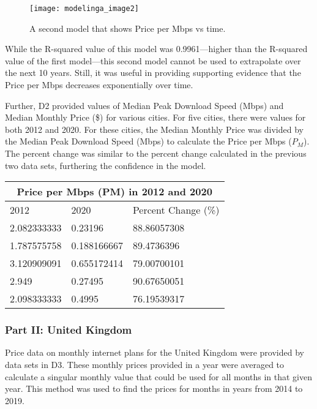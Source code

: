 	\renewcommand{\thefigure}{2}
	\begin{figure}[htp]
    \centering
    \begin{minipage}{9cm}
    \texttt{[image: modelinga\_image2]}
    \caption{A second model that shows Price per Mbps vs time.}
    \label{fig:2}
    \end{minipage}
    \end{figure}
	
	While the R-squared value of this model was 0.9961—higher than the R-squared value of the first model—this second model cannot be used to extrapolate over the next 10 years. Still, it was useful in providing supporting evidence that the Price per Mbps decreases exponentially over time.

    Further, D2 provided values of Median Peak Download Speed (Mbps) and Median Monthly Price (\$) for various cities. For five cities, there were values for both 2012 and 2020. For these cities, the Median Monthly Price was divided by the Median Peak Download Speed (Mbps) to calculate the Price per Mbps ($P_M$). The percent change was similar to the percent change calculated in the previous two data sets, furthering the confidence in the model.
	
	
	\begin{center}
\begin{tabular}{|l|l|l|}
\hline
\multicolumn{3}{|c|}{Price per Mbps (PM) in 2012 and 2020} \\ \hline
2012            & 2020            & Percent Change (\%)    \\ \hline
2.082333333     & 0.23196         & 88.86057308            \\ \hline
1.787575758     & 0.188166667     & 89.4736396             \\ \hline
3.120909091     & 0.655172414     & 79.00700101            \\ \hline
2.949           & 0.27495         & 90.67650051            \\ \hline
2.098333333     & 0.4995          & 76.19539317            \\ \hline
\end{tabular}
\end{center}
	
    \subsubsection*{Part II: United Kingdom}
    
    Price data on monthly internet plans for the United Kingdom were provided by data sets in D3. These monthly prices provided in a year were averaged to calculate a singular monthly value that could be used for all months in that given year. This method was used to find the prices for months in years from 2014 to 2019.

